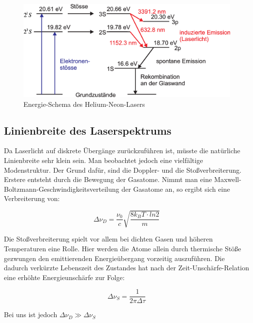 \begin{figure}[h]
\begin{center}
\includegraphics[scale=0.4]{img/HNL8}
\caption{Energie-Schema des Helium-Neon-Lasers}
\end{center}
\end{figure}

\subsection{Linienbreite des Laserspektrums}
Da Laserlicht auf diskrete Übergänge zurückzuführen ist, müsste die natürliche Linienbreite sehr klein sein. Man beobachtet jedoch eine vielfältige Modenstruktur. Der Grund dafür, sind die Doppler- und die Stoßverbreiterung. Erstere entsteht durch die Bewegung der Gasatome. Nimmt man eine Maxwell-Boltzmann-Geschwindigkeitsverteilung der Gasatome an, so ergibt sich eine Verbreiterung von:

\begin{equation}
\Delta \nu_D = \frac{\nu_0}{c}\sqrt{\frac{8k_BT\cdot ln 2}{m}}
\end{equation}

Die Stoßverbreiterung spielt vor allem bei dichten Gasen und höheren Temperaturen eine Rolle. Hier werden die Atome allein durch thermische  Stöße gezwungen den emittierenden Energieübergang vorzeitig auszuführen. Die dadurch verkürzte Lebenszeit des Zustandes hat nach der Zeit-Unschärfe-Relation eine erhöhte Energieunschärfe zur Folge:

\begin{equation}
\Delta \nu_S = \frac{1}{2\pi \Delta \tau}
\end{equation}

Bei uns ist jedoch $\Delta \nu_D \gg \Delta \nu_S$